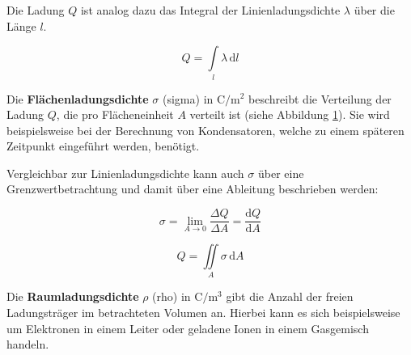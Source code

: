 \begin{frame}
{	Die Ladung $Q$ ist analog dazu das Integral der Linienladungsdichte $\lambda$ über die Länge $l$.
	
	\begin{equation*}
		Q = \int\limits_l \lambda \, \mathrm{d}l
	\end{equation*}


	Die \textbf{Flächenladungsdichte} $\sigma$ (sigma) in $\mathrm{C/m^2}$ beschreibt die Verteilung der Ladung $Q$,
	 die pro Flächeneinheit $A$ verteilt ist (siehe Abbildung \ref{fig:flächenladung}). 
	Sie wird beispielsweise bei der Berechnung von Kondensatoren, welche zu einem späteren Zeitpunkt eingeführt werden, benötigt.

	\begin{figure}[ht]
		\centering
	
		\label{fig:flächenladung}
		
	\end{figure}


	

	Vergleichbar zur Linienladungsdichte kann auch $\sigma$ über eine Grenzwertbetrachtung und damit über eine Ableitung beschrieben werden: 


	\begin{equation*}
		\sigma = \lim \limits_{A \to 0} \frac{\Delta Q}{\Delta A} = \frac{\mathrm{d}Q}{\mathrm{d}A}
	\end{equation*}

	\begin{equation*}
		Q = \iint\limits_A \sigma \, \mathrm{d}A
	\end{equation*}

	Die \textbf{Raumladungsdichte} $\rho$ (rho) in $\mathrm{C/m^3}$ gibt die Anzahl der freien Ladungsträger im betrachteten Volumen an. 
	Hierbei kann es sich beispielsweise um Elektronen in einem Leiter oder geladene Ionen in einem Gasgemisch handeln.
	

	\begin{figure}[ht]
		\centering
	
		\label{fig:raumladung}


\end{figure}}
\end{frame}
